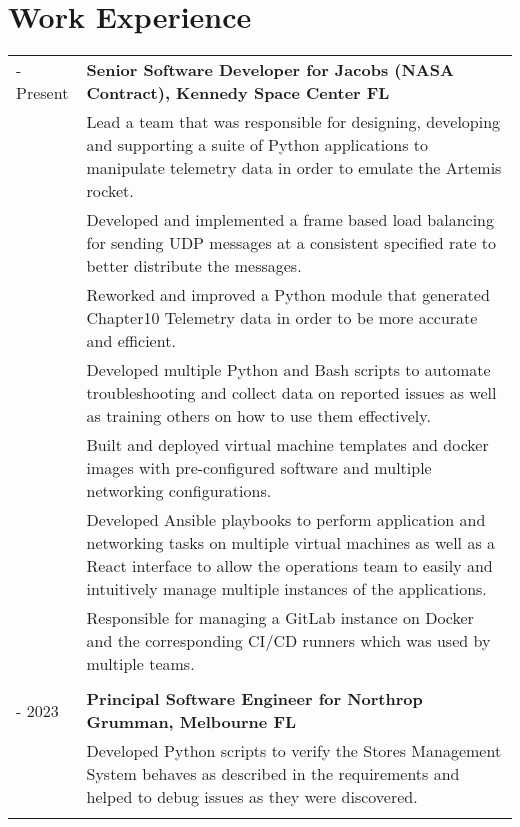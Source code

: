 \documentclass[11pt, letterpaper]{article}
\begin{document}
\section*{\selectfont Work Experience}
\vspace{-0.5cm}
\begin{longtable}{p{1in}|p{6in}}
    \centering 2023 - Present & \textbf{Senior Software Developer for Jacobs (NASA Contract), Kennedy Space Center FL}\\&
        Lead a team that was responsible for designing, developing and supporting a suite of Python applications to manipulate telemetry data in order to emulate the Artemis rocket. \vspace{0.2cm} \\&
        Developed and implemented a frame based load balancing for sending UDP messages at a consistent specified rate to better distribute the messages. \vspace{0.2cm} \\&
        Reworked and improved a Python module that generated Chapter10 Telemetry data in order to be more accurate and efficient. \vspace{0.2cm} \\&
        Developed multiple Python and Bash scripts to automate troubleshooting and collect data on reported issues as well as training others on how to use them effectively. \vspace{0.2cm} \\&
        Built and deployed virtual machine templates and docker images with pre-configured software and multiple networking configurations. \vspace{0.2cm} \\&
        Developed Ansible playbooks to perform application and networking tasks on multiple virtual machines as well as a React interface to allow the operations team to easily and intuitively manage multiple instances of the applications. \vspace{0.2cm} \\&
        Responsible for managing a GitLab instance on Docker and the corresponding CI/CD runners which was used by multiple teams. \\
	\multicolumn{2}{c}{}\\
    \centering 2019 - 2023 & \textbf{Principal Software Engineer for Northrop Grumman, Melbourne FL}\vspace{0.1cm}\\&
        Developed Python scripts to verify the Stores Management System behaves as described in the requirements and helped to debug issues as they were discovered.\vspace{0.2cm}\\&

\end{longtable}
\end{document}
